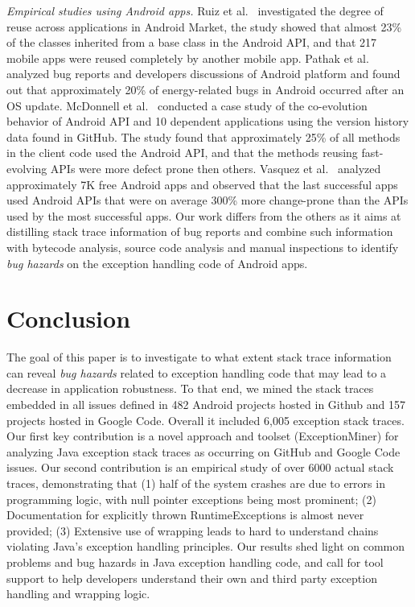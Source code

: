 \documentclass[conference]{IEEEtran}
\begin{document}
\textit{Empirical studies using Android apps.} Ruiz et al.~\cite{Ruiz12}
investigated the degree of reuse across applications in Android Market, the
study showed that almost 23\% of the classes inherited from a base class in the
Android API, and that 217 mobile apps were reused completely by another mobile
app. Pathak et al.~\cite{Patha11} analyzed bug reports and developers
discussions of Android platform and found out that approximately 20\% of
energy-related bugs in Android occurred after an OS update. McDonnell et
al.~\cite{McDon13} conducted a case study of the co-evolution behavior of
Android API and 10 dependent applications using the version history data found
in GitHub. The study found that approximately 25\% of all methods in the client
code used the Android API, and that the methods reusing fast-evolving APIs were
more defect prone then others. Vasquez et al.~\cite{Linar13} analyzed
approximately 7K free Android apps and observed that the last successful apps
used Android APIs that were on average 300\% more change-prone than the APIs
used by the most successful apps. Our work differs from the others as it aims at
distilling stack trace information of bug reports and combine such information
with bytecode analysis, source code analysis and manual inspections
to identify \emph{bug hazards} on the exception handling code of Android apps.



\section{Conclusion}
\label{sec:conc}

The goal of this paper is to investigate 
to what extent stack trace information can reveal \emph{bug hazards} 
related to exception handling code that may lead to a decrease in
application robustness. 
To that end, we mined the stack 
traces embedded in all issues defined in 482 Android projects hosted in Github and 
157 projects hosted in Google Code. Overall it included 6,005
exception stack traces. Our first key contribution is
a novel approach and toolset (ExceptionMiner) for analyzing Java
  exception stack traces as occurring on GitHub and Google Code
  issues.
Our second contribution is
an empirical study of over 6000 actual stack traces,
  demonstrating that (1) half of the system crashes are due to errors
  in programming logic, with null pointer exceptions being most
  prominent;
  (2) Documentation for explicitly thrown RuntimeExceptions is almost
  never provided; 
  (3) Extensive use of wrapping leads to hard to understand chains
  violating Java's exception handling principles.
Our results shed light on common problems and bug hazards in Java
exception handling code, and call for tool support to help developers
understand their own and third party exception handling and wrapping logic.
\end{document}
